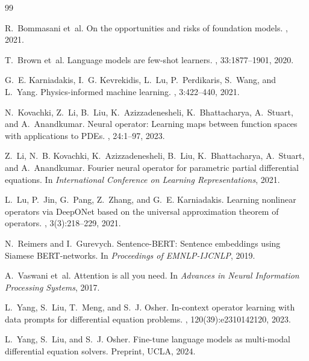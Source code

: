 \documentclass[11pt]{article}
\begin{document}
\begin{thebibliography}{99}

R.~Bommasani et~al.
\newblock On the opportunities and risks of foundation models.
, 2021.

T.~Brown et~al.
\newblock Language models are few-shot learners.
, 33:1877--1901, 2020.

G.~E. Karniadakis, I.~G. Kevrekidis, L.~Lu, P.~Perdikaris, S.~Wang, and L.~Yang.
\newblock Physics-informed machine learning.
, 3:422--440, 2021.

N.~Kovachki, Z.~Li, B.~Liu, K.~Azizzadenesheli, K.~Bhattacharya, A.~Stuart, and A.~Anandkumar.
\newblock Neural operator: Learning maps between function spaces with applications to PDEs.
, 24:1--97, 2023.

Z.~Li, N.~B. Kovachki, K.~Azizzadenesheli, B.~Liu, K.~Bhattacharya, A.~Stuart, and A.~Anandkumar.
\newblock Fourier neural operator for parametric partial differential equations.
\newblock In {\em International Conference on Learning Representations}, 2021.

L.~Lu, P.~Jin, G.~Pang, Z.~Zhang, and G.~E. Karniadakis.
\newblock Learning nonlinear operators via DeepONet based on the universal approximation theorem of operators.
, 3(3):218--229, 2021.

N.~Reimers and I.~Gurevych.
\newblock Sentence-BERT: Sentence embeddings using Siamese BERT-networks.
\newblock In {\em Proceedings of EMNLP-IJCNLP}, 2019.

A.~Vaswani et~al.
\newblock Attention is all you need.
\newblock In {\em Advances in Neural Information Processing Systems}, 2017.

L.~Yang, S.~Liu, T.~Meng, and S.~J. Osher.
\newblock In-context operator learning with data prompts for differential equation problems.
, 120(39):e2310142120, 2023.

L.~Yang, S.~Liu, and S.~J. Osher.
\newblock Fine-tune language models as multi-modal differential equation solvers.
\newblock Preprint, UCLA, 2024.

\end{thebibliography}
\end{document}
